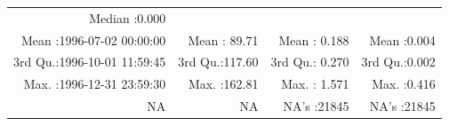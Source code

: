 \documentclass[
  10pt,
  a4paper,oneside]{article}
\begin{document}
\begin{longtable}[]{@{}rrrr@{}}
\begin{minipage}[t]{0.19\columnwidth}
Median :0.000\strut
\end{minipage}\tabularnewline
\begin{minipage}[t]{0.33\columnwidth}\raggedleft
Mean :1996-07-02 00:00:00\strut
\end{minipage} & \begin{minipage}[t]{0.19\columnwidth}\raggedleft
Mean : 89.71\strut
\end{minipage} & \begin{minipage}[t]{0.19\columnwidth}\raggedleft
Mean : 0.188\strut
\end{minipage} & \begin{minipage}[t]{0.19\columnwidth}\raggedleft
Mean :0.004\strut
\end{minipage}\tabularnewline
\begin{minipage}[t]{0.33\columnwidth}\raggedleft
3rd Qu.:1996-10-01 11:59:45\strut
\end{minipage} & \begin{minipage}[t]{0.19\columnwidth}\raggedleft
3rd Qu.:117.60\strut
\end{minipage} & \begin{minipage}[t]{0.19\columnwidth}\raggedleft
3rd Qu.: 0.270\strut
\end{minipage} & \begin{minipage}[t]{0.19\columnwidth}\raggedleft
3rd Qu.:0.002\strut
\end{minipage}\tabularnewline
\begin{minipage}[t]{0.33\columnwidth}\raggedleft
Max. :1996-12-31 23:59:30\strut
\end{minipage} & \begin{minipage}[t]{0.19\columnwidth}\raggedleft
Max. :162.81\strut
\end{minipage} & \begin{minipage}[t]{0.19\columnwidth}\raggedleft
Max. : 1.571\strut
\end{minipage} & \begin{minipage}[t]{0.19\columnwidth}\raggedleft
Max. :0.416\strut
\end{minipage}\tabularnewline
\begin{minipage}[t]{0.33\columnwidth}\raggedleft
NA\strut
\end{minipage} & \begin{minipage}[t]{0.19\columnwidth}\raggedleft
NA\strut
\end{minipage} & \begin{minipage}[t]{0.19\columnwidth}\raggedleft
NA's :21845\strut
\end{minipage} & \begin{minipage}[t]{0.19\columnwidth}\raggedleft
NA's :21845\strut
\end{minipage}\tabularnewline
\bottomrule
\end{longtable}
\end{document}
